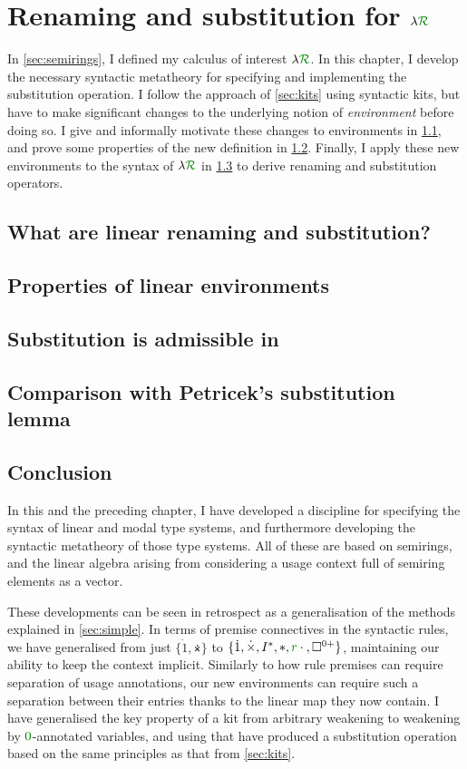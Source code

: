 \chapter{Renaming and substitution for $\name$}\label{sec:ren-sub-lr}

In \cref{sec:semirings}, I defined my calculus of interest $\name$.
In this chapter, I develop the necessary syntactic metatheory for
specifying and implementing the substitution operation.
I follow the approach of \cref{sec:kits} using syntactic kits, but have to make
significant changes to the underlying notion of \emph{environment} before doing
so.
I give and informally motivate these changes to environments in
\cref{sec:lrkits}, and prove some properties of the new definition in
\cref{sec:lenv}.
Finally, I apply these new environments to the syntax of $\name$ in
\cref{sec:lrsub} to derive renaming and substitution operators.

\section{What are linear renaming and substitution?}\label{sec:lrkits}

\section{Properties of linear environments}\label{sec:lenv}

\section{Substitution is admissible in \name{}}\label{sec:lrsub}

\section{Comparison with Petricek's substitution lemma}\label{sec:petricek}

\section{Conclusion}\label{sec:ren-sub-lr-conc}

In this and the preceding chapter, I have developed a discipline for specifying
the syntax of linear and modal type systems, and furthermore developing the
syntactic metatheory of those type systems.
All of these are based on semirings, and the linear algebra arising from
considering a usage context full of semiring elements as a vector.

These developments can be seen in retrospect as a generalisation of the methods
explained in \cref{sec:simple}.
In terms of premise connectives in the syntactic rules, we have generalised from
just $\{\dot1, \dottimes\}$ to
$\{\dot1, \dottimes, I^*, \sep, \gr r\cdot{}, \Box^{0{+}}\}$, maintaining our
ability to keep the context implicit.
Similarly to how rule premises can require separation of usage annotations, our
new environments can require such a separation between their entries thanks to
the linear map they now contain.
I have generalised the key property of a kit from arbitrary weakening to
weakening by $\gr0$-annotated variables, and using that have produced a
substitution operation based on the same principles as that from
\cref{sec:kits}.

